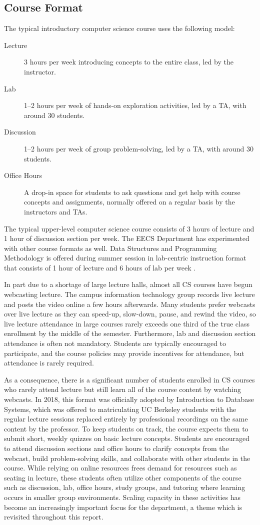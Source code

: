 \subsection{Course Format}

The typical introductory computer science course uses the following model:
\begin{description}
\item[Lecture] 3 hours per week introducing concepts to the entire class, led by the instructor.
\item[Lab] 1--2 hours per week of hands-on exploration activities, led by a TA, with around 30 students.
\item[Discussion] 1--2 hours per week of group problem-solving, led by a TA, with around 30 students.
\item[Office Hours] A drop-in space for students to ask questions and get help with course concepts and assignments, normally offered on a regular basis by the instructors and TAs. 
\end{description}
The typical upper-level computer science course consists of 3 hours of lecture and 1 hour of discussion section per week. The EECS Department has experimented with other course formats as well. Data Structures and Programming Methodology is offered during summer session in lab-centric instruction format that consists of 1 hour of lecture and 6 hours of lab per week \cite{Titterton:2010}.

In part due to a shortage of large lecture halls, almost all CS courses have begun webcasting lecture. The campus information technology group records live lecture and posts the video online a few hours afterwards. Many students prefer webcasts over live lecture as they can speed-up, slow-down, pause, and rewind the video, so live lecture attendance in large courses rarely exceeds one third of the true class enrollment by the middle of the semester. Furthermore, lab and discussion section attendance is often not mandatory. Students are typically encouraged to participate, and the course policies may provide incentives for attendance, but attendance is rarely required.

As a consequence, there is a significant number of students enrolled in CS courses who rarely attend lecture but still learn all of the course content by watching webcasts. In 2018, this format was officially adopted by Introduction to Database Systems, which was offered to matriculating UC Berkeley students with the regular lecture sessions replaced entirely by professional recordings on the same content by the professor. To keep students on track, the course expects them to submit short, weekly quizzes on basic lecture concepts. Students are encouraged to attend discussion sections and office hours to clarify concepts from the webcast, build problem-solving skills, and collaborate with other students in the course. While relying on online resources frees demand for resources such as seating in lecture, these students often utilize other components of the course such as discussion, lab, office hours, study groups, and tutoring where learning occurs in smaller group environments. Scaling capacity in these activities has become an increasingly important focus for the department, a theme which is revisited throughout this report.